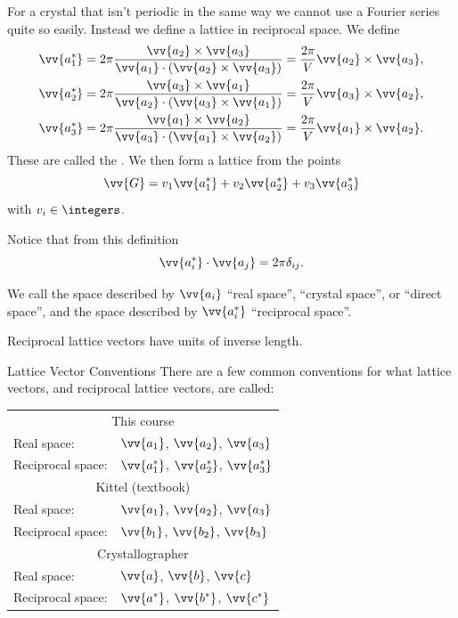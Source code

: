 \documentclass[fleqn]{NotesClass}
\begin{document}
    For a crystal that isn't periodic in the same way we cannot use a Fourier series quite so easily.
    Instead we define a lattice in reciprocal space.
    We define
    \begin{align}
        \vv{a_1^*} &= 2\pi \frac{\vv{a_2}\times\vv{a_3}}{\vv{a_1}\cdot(\vv{a_2}\times\vv{a_3})} = \frac{2\pi}{V} \vv{a_2}\times\vv{a_3},\\
        \vv{a_2^*} &= 2\pi \frac{\vv{a_3}\times\vv{a_1}}{\vv{a_2}\cdot(\vv{a_3}\times\vv{a_1})} = \frac{2\pi}{V} \vv{a_3}\times\vv{a_2},\\
        \vv{a_3^*} &= 2\pi \frac{\vv{a_1}\times\vv{a_2}}{\vv{a_3}\cdot(\vv{a_1}\times\vv{a_2})} = \frac{2\pi}{V} \vv{a_1}\times\vv{a_2}.
    \end{align}
    These are called the .
    We then form a lattice from the points
    \begin{equation}
        \vv{G} = v_1\vv{a_1^*} + v_2\vv{a_2^*} + v_3\vv{a_3^*}
    \end{equation}
    with \(v_i \in \integers\).
    
    Notice that from this definition
    \begin{equation}
        \vv{a_i^*} \cdot \vv{a_j} = 2\pi \delta_{ij}.
    \end{equation}
    
    We call the space described by \(\vv{a_i}\) \enquote{real space}, \enquote{crystal space}, or \enquote{direct space}, and the space described by \(\vv{a_i^*}\) \enquote{reciprocal space}.
    
    Reciprocal lattice vectors have units of inverse length.
    
    \begin{ntn}{Lattice Vector Conventions}{}
        There are a few common conventions for what lattice vectors, and reciprocal lattice vectors, are called:
        \begin{tabular}{ll}\toprule
            \multicolumn{2}{c}{This course}\\
            Real space: & \(\vv{a_1}\), \(\vv{a_2}\), \(\vv{a_3}\)\\
            Reciprocal space: & \(\vv{a_1^*}\), \(\vv{a_2^*}\), \(\vv{a_3^*}\)\\\midrule
            \multicolumn{2}{c}{Kittel (textbook)}\\
            Real space: & \(\vv{a_1}\), \(\vv{a_2}\), \(\vv{a_3}\)\\
            Reciprocal space: & \(\vv{b_1}\), \(\vv{b_2}\), \(\vv{b_3}\)\\\midrule
            \multicolumn{2}{c}{Crystallographer}\\
            Real space: & \(\vv{a}\), \(\vv{b}\), \(\vv{c}\)\\
            Reciprocal space: & \(\vv{a^*}\), \(\vv{b^*}\), \(\vv{c^*}\)\\\bottomrule
        \end{tabular}
    \end{ntn}
\end{document}
